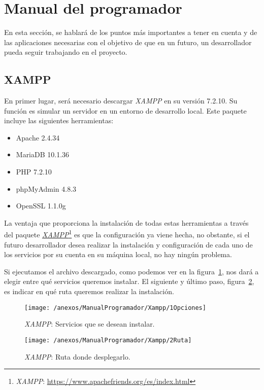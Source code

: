 \section{Manual del programador}

En esta sección, se hablará de los puntos más importantes a tener en cuenta y de las aplicaciones necesarias con el objetivo de que en un futuro, un desarrollador pueda seguir trabajando en el proyecto.

\subsection{XAMPP}

En primer lugar, será necesario descargar \textit{XAMPP} en su versión 7.2.10. Su función es simular un servidor en un entorno de desarrollo local. Este paquete incluye las siguientes herramientas:

\begin{itemize}
	\item Apache 2.4.34
	\item MariaDB 10.1.36
	\item PHP 7.2.10
	\item phpMyAdmin 4.8.3
	\item OpenSSL 1.1.0g
\end{itemize}

La ventaja que proporciona la instalación de todas estas herramientas a través del paquete \href{https://www.apachefriends.org/es/index.html}{\textit{XAMPP}}\footnote{\textit{XAMPP}: \url{https://www.apachefriends.org/es/index.html}} es que la configuración ya viene hecha, no obstante, si el futuro desarrollador desea realizar la instalación y configuración de cada uno de los servicios por su cuenta en su máquina local, no hay ningún problema.

Si ejecutamos el archivo descargado, como podemos ver en la figura~\ref{img:XAMPP_Opciones}, nos dará a elegir entre qué servicios queremos instalar. El siguiente y último paso, figura~\ref{img:XAMPP_Ruta}, es indicar en qué ruta queremos realizar la instalación. 

\begin{figure}[h]
	\centering
	\texttt{[image: /anexos/ManualProgramador/Xampp/1Opciones]}
	\caption{\textit{XAMPP}: Servicios que se desean instalar.}
	\label{img:XAMPP_Opciones}
\end{figure}

\begin{figure}[h]
	\centering
	\texttt{[image: /anexos/ManualProgramador/Xampp/2Ruta]}
	\caption{\textit{XAMPP}: Ruta donde desplegarlo.}
	\label{img:XAMPP_Ruta}
\end{figure}

